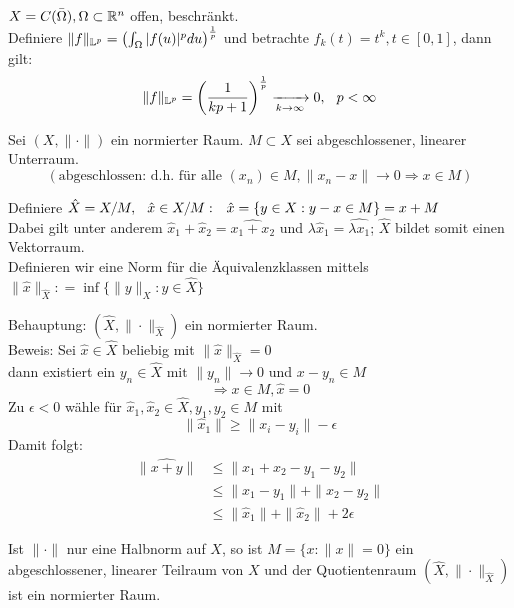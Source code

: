 \begin{beispiel}
$X = C(\bar\Omega), \Omega \subset \mathbb{R}^{n}$ offen, beschränkt. \\
Definiere $\| f \|_{\mathbb{L}^{p}} = \left( \int_{\Omega} |f(u)|^{p} du \right)^{\frac{1}{p}}$ und betrachte $f_{k}(t) = t^k, t \in [0, 1]$, dann gilt:
 \[ \| f \|_{\mathbb{L}^{p}} = \left( \frac{1}{kp + 1} \right)^{\frac{1}{p}} \xrightarrow[k \rightarrow \infty]{} 0, \hspace{0.25cm} p < \infty \]
\end{beispiel}

\begin{definition}[Quotientenräume]
Sei $(X, \| \cdot \|)$ ein normierter Raum. $M \subset X$ sei abgeschlossener, linearer Unterraum. \[ (\text{abgeschlossen: d.h. für alle } (x_{n}) \in M, \| x_{n} - x \| \rightarrow 0 \Rightarrow x \in M) \]

Definiere $\hat X = X / M, \hspace{0.25cm} \hat x \in X/M: \hspace{0.25cm} \hat x = \{ y \in X: y - x \in M \} = x + M$ \\
Dabei gilt unter anderem $\hat x_{1} + \hat x_{2} = \hat{x_{1} + x_{2}}$ und $\lambda \hat x_{1} = \hat{\lambda x_{1}}$; $\hat X$ bildet somit einen Vektorraum. \\
Definieren wir eine Norm für die Äquivalenzklassen mittels $\| \hat x \|_{\hat X} : = \inf \{ \| y \|_{X}: y \in \hat X \}$

Behauptung: $(\hat X, \| \cdot \|_{\hat X})$ ein normierter Raum. \\
Beweis: Sei $\hat x \in \hat X$ beliebig mit $\| \hat x \|_{\hat X} = 0$ \\
 dann existiert ein $y_{n} \in \hat X \text{ mit } \| y_{n} \| \rightarrow 0$ und $x - y_{n} \in M$
	\[ \Rightarrow x \in M, \hat x = 0 \]
Zu $\epsilon< 0$ wähle für $\hat x_{1}, \hat x_{2} \in \hat X, y_{1}, y_{2} \in M$ mit
	\[ \| \hat x_{1} \| \geq \| x_{i} - y_{i} \| - \epsilon \] 
	Damit folgt:
	\begin{align*}
		\| \hat{x + y} \| & \leq \| x_{1} + x_{2} - y_{1} - y_{2} \| \\
						  & \leq \| x_{1} - y_{1} \| + \| x_{2} - y_{2} \| \\
						  & \leq \| \hat x_{1} \| + \| \hat x_{2} \| + 2 \epsilon
	\end{align*}
\end{definition}

\begin{bemerkung}
Ist $\| \cdot \|$ nur eine Halbnorm auf $X$, so ist $M = \{ x: \| x \| = 0 \}$ ein abgeschlossener, linearer Teilraum von $X$ und der Quotientenraum $(\hat X, \| \cdot \|_{\hat X})$ ist ein normierter Raum.
\end{bemerkung}


